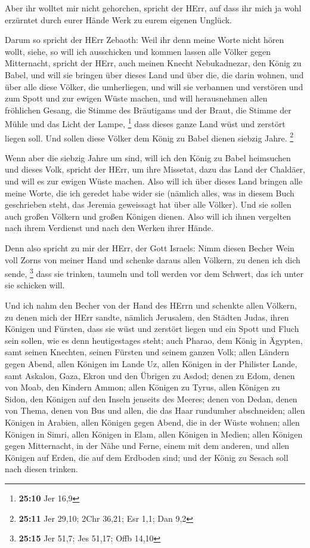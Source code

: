  Aber ihr wolltet mir nicht gehorchen, spricht der HErr, auf
dass ihr mich ja wohl erzürntet durch eurer Hände Werk zu eurem eigenen
Unglück.

 Darum so spricht der HErr Zebaoth: Weil ihr denn meine
Worte nicht hören wollt,  siehe, so will ich ausschicken und
kommen lassen alle Völker gegen Mitternacht, spricht der HErr, auch
meinen Knecht Nebukadnezar, den König zu Babel, und will sie bringen
über dieses Land und über die, die darin wohnen, und über alle diese
Völker, die umherliegen, und will sie verbannen und verstören und zum
Spott und zur ewigen Wüste machen,  und will herausnehmen
allen fröhlichen Gesang, die Stimme des Bräutigams und der Braut, die
Stimme der Mühle und das Licht der Lampe, \footnote{\textbf{25:10} Jer
  16,9}  dass dieses ganze Land wüst und zerstört liegen
soll. Und sollen diese Völker dem König zu Babel dienen siebzig Jahre.
\footnote{\textbf{25:11} Jer 29,10; 2Chr 36,21; Esr 1,1; Dan 9,2}

 Wenn aber die siebzig Jahre um sind, will ich den König zu
Babel heimsuchen und dieses Volk, spricht der HErr, um ihre Missetat,
dazu das Land der Chaldäer, und will es zur ewigen Wüste machen.
 Also will ich über dieses Land bringen alle meine Worte,
die ich geredet habe wider sie (nämlich alles, was in diesem Buch
geschrieben steht, das Jeremia geweissagt hat über alle Völker).
 Und sie sollen auch großen Völkern und großen Königen
dienen. Also will ich ihnen vergelten nach ihrem Verdienst und nach den
Werken ihrer Hände.

 Denn also spricht zu mir der HErr, der Gott Israels: Nimm
diesen Becher Wein voll Zorns von meiner Hand und schenke daraus allen
Völkern, zu denen ich dich sende, \footnote{\textbf{25:15} Jer 51,7; Jes
  51,17; Offb 14,10}  dass sie trinken, taumeln und toll
werden vor dem Schwert, das ich unter sie schicken will.

 Und ich nahm den Becher von der Hand des HErrn und
schenkte allen Völkern, zu denen mich der HErr sandte, 
nämlich Jerusalem, den Städten Judas, ihren Königen und Fürsten, dass
sie wüst und zerstört liegen und ein Spott und Fluch sein sollen, wie es
denn heutigestages steht;  auch Pharao, dem König in
Ägypten, samt seinen Knechten, seinen Fürsten und seinem ganzen Volk;
 allen Ländern gegen Abend, allen Königen im Lande Uz,
allen Königen in der Philister Lande, samt Askalon, Gaza, Ekron und den
Übrigen zu Asdod;  denen zu Edom, denen von Moab, den
Kindern Ammon;  allen Königen zu Tyrus, allen Königen zu
Sidon, den Königen auf den Inseln jenseits des Meeres; 
denen von Dedan, denen von Thema, denen von Bus und allen, die das Haar
rundumher abschneiden;  allen Königen in Arabien, allen
Königen gegen Abend, die in der Wüste wohnen;  allen
Königen in Simri, allen Königen in Elam, allen Königen in Medien;
 allen Königen gegen Mitternacht, in der Nähe und Ferne,
einem mit dem anderen, und allen Königen auf Erden, die auf dem Erdboden
sind; und der König zu Sesach soll nach diesen trinken.

